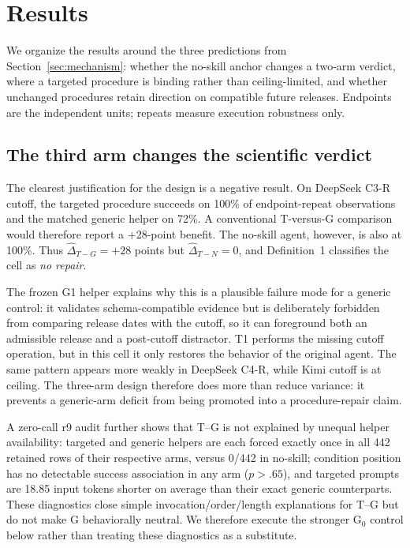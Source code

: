 \section{Results}
\label{sec:results}
We organize the results around the three predictions from Section~\ref{sec:mechanism}: whether the no-skill anchor changes a two-arm verdict, where a targeted procedure is binding rather than ceiling-limited, and whether unchanged procedures retain direction on compatible future releases. Endpoints are the independent units; repeats measure execution robustness only.

\subsection{The third arm changes the scientific verdict}
\label{sec:falsepositive}
The clearest justification for the design is a negative result. On DeepSeek C3-R cutoff, the targeted procedure succeeds on 100\% of endpoint-repeat observations and the matched generic helper on 72\%. A conventional T-versus-G comparison would therefore report a +28-point benefit. The no-skill agent, however, is also at 100\%. Thus $\widehat{\Delta}_{T-G}=+28$ points but $\widehat{\Delta}_{T-N}=0$, and Definition~1 classifies the cell as \emph{no repair}.

The frozen G1 helper explains why this is a plausible failure mode for a generic control: it validates schema-compatible evidence but is deliberately forbidden from comparing release dates with the cutoff, so it can foreground both an admissible release and a post-cutoff distractor. T1 performs the missing cutoff operation, but in this cell it only restores the behavior of the original agent. The same pattern appears more weakly in DeepSeek C4-R, while Kimi cutoff is at ceiling. The three-arm design therefore does more than reduce variance: it prevents a generic-arm deficit from being promoted into a procedure-repair claim.

A zero-call r9 audit further shows that T--G is not explained by unequal helper availability: targeted and generic helpers are each forced exactly once in all 442 retained rows of their respective arms, versus 0/442 in no-skill; condition position has no detectable success association in any arm ($p>.65$), and targeted prompts are 18.85 input tokens shorter on average than their exact generic counterparts. These diagnostics close simple invocation/order/length explanations for T--G but do not make G behaviorally neutral. We therefore execute the stronger G$_0$ control below rather than treating these diagnostics as a substitute.

